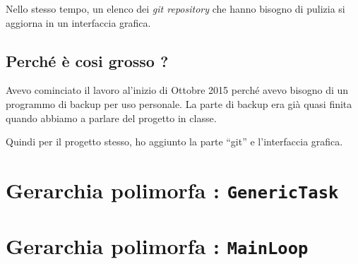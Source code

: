 \documentclass[a4paper,12pt]{article}
\newcommand{\info}[1]{\texttt{#1}}
\begin{document}
Nello stesso tempo, un elenco dei \emph{git repository} che hanno bisogno di pulizia si aggiorna in un interfaccia grafica.

\subsection{Perché è cosi grosso ?}

Avevo cominciato il lavoro al'inizio di Ottobre 2015 perché avevo bisogno di un programmo di backup per uso personale. La parte di backup era già quasi finita quando abbiamo a parlare del progetto in classe.

Quindi per il progetto stesso, ho aggiunto la parte ``git'' e l'interfaccia grafica.


\section{Gerarchia polimorfa : \info{GenericTask}}
\label{SECooVDGXooHTFdPE}

\section{Gerarchia polimorfa : \info{MainLoop}}
\end{document}
